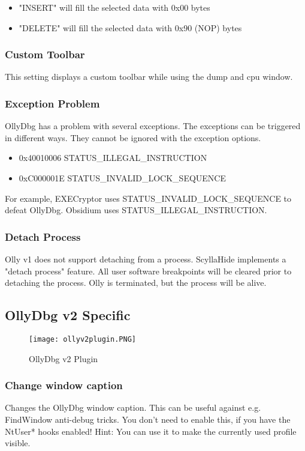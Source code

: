 \documentclass[10pt,a4paper]{article}
\begin{document}
\begin{itemize}
\item "INSERT" will fill the selected data with 0x00 bytes
\item "DELETE" will fill the selected data with 0x90 (NOP) bytes
\end{itemize}

\subsubsection{Custom Toolbar}
This setting displays a custom toolbar while using the dump and cpu window.


\subsubsection{Exception Problem}
OllyDbg has a problem with several exceptions. The exceptions can be triggered in different ways. They cannot be ignored with the exception options.

\begin{itemize}
\item 0x40010006 STATUS\_ILLEGAL\_INSTRUCTION
\item 0xC000001E STATUS\_INVALID\_LOCK\_SEQUENCE
\end{itemize}

For example, EXECryptor uses STATUS\_INVALID\_LOCK\_SEQUENCE to defeat OllyDbg. Obsidium uses STATUS\_ILLEGAL\_INSTRUCTION.

\subsubsection{Detach Process}
Olly v1 does not support detaching from a process. ScyllaHide implements a "detach process" feature. All user software breakpoints will be cleared prior to detaching the process. Olly is terminated, but the process will be alive.


\subsection{OllyDbg v2 Specific}

\begin{figure}[H]
\centering
\texttt{[image: ollyv2plugin.PNG]}
\caption{OllyDbg v2 Plugin}
\end{figure}

\subsubsection{Change window caption}
Changes the OllyDbg window caption. This can be useful against e.g. FindWindow anti-debug tricks. You don't need to enable this, if you have the NtUser* hooks enabled! Hint: You can use it to make the currently used profile visible.
\end{document}
